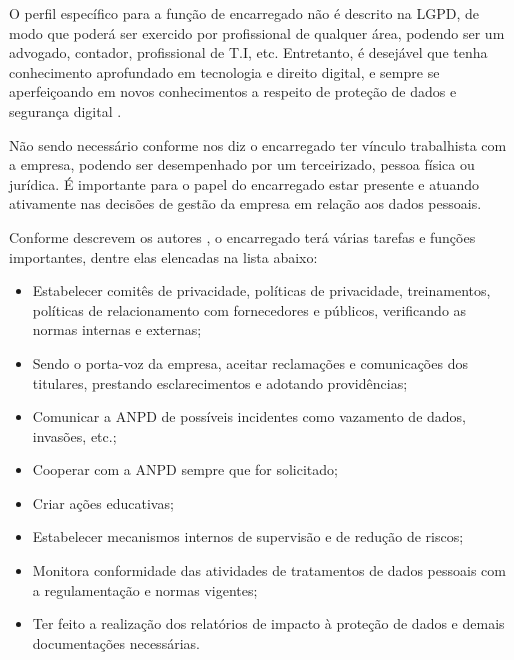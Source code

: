 \documentclass[
	12pt,				%
	openright,			%
	oneside,			%
	a4paper,			%
	english,			%
	french,				%
	spanish,			%
	brazil,				%
	]{abntex2}
\begin{document}
O perfil específico para a função de encarregado não é descrito na LGPD, de modo que poderá ser exercido por profissional de qualquer área, podendo ser um advogado, contador, profissional de T.I, etc. Entretanto, é desejável que tenha conhecimento aprofundado em tecnologia e direito digital, e sempre se aperfeiçoando em novos conhecimentos a respeito de proteção de dados e segurança digital \cite{Pohlmann2019}.

Não sendo necessário conforme nos diz  o encarregado ter vínculo trabalhista com a empresa, podendo ser desempenhado por um terceirizado, pessoa física ou jurídica.  É importante para o papel do encarregado estar presente e atuando ativamente nas decisões de gestão da empresa em relação aos dados pessoais.

Conforme descrevem os autores , o encarregado terá várias tarefas e funções importantes, dentre elas elencadas na lista abaixo:


\begin{itemize}
\item Estabelecer comitês de privacidade, políticas de privacidade, treinamentos, políticas de relacionamento com fornecedores e públicos, verificando as normas internas e externas;
\item Sendo o porta-voz da empresa, aceitar reclamações e comunicações dos titulares, prestando esclarecimentos e adotando providências;
\item Comunicar a ANPD de possíveis incidentes como vazamento de dados, invasões, etc.; 
\item Cooperar com a ANPD sempre que for solicitado;
\item Criar ações educativas;
\item Estabelecer mecanismos internos de supervisão e de redução de riscos;
\item Monitora conformidade das atividades de tratamentos de dados pessoais com a regulamentação e normas vigentes;
\item Ter feito a realização dos relatórios de impacto à proteção de dados e demais documentações necessárias.
\end{itemize}



\end{document}
